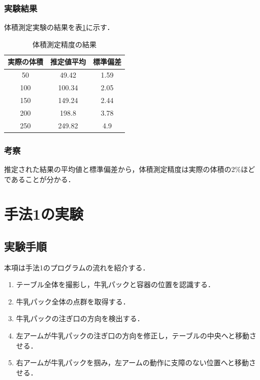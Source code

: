 		\subsubsection{実験結果}
		体積測定実験の結果を表\ref{Result0}に示す．
			\begin{table}[h]
				\centering
				\caption{体積測定精度の結果}
				\begin{tabular}{@{}ccc@{}}
					\toprule 
					実際の体積 & 推定値平均 & 標準偏差 \\ 
					\midrule
					50&  49.42 & 1.59 \\ 
					100&  100.34 & 2.05 \\ 
					150& 149.24 & 2.44 \\ 
					200& 198.8 & 3.78 \\ 
					250& 249.82 & 4.9 \\ 
					\bottomrule 
				\end{tabular} 
				
				\label{Result0}
			\end{table}
		
		\subsubsection{考察}
		推定された結果の平均値と標準偏差から，体積測定精度は実際の体積の2\%ほどであることが分かる．
		
\section{手法1の実験}
	\subsection{実験手順}\label{sec:Method1Exp-ProgramFlow}
	本項は手法1のプログラムの流れを紹介する．
	\begin{enumerate}
		\item テーブル全体を撮影し，牛乳パックと容器の位置を認識する．\\
		\item 牛乳パック全体の点群を取得する．
		\item 牛乳パックの注ぎ口の方向を検出する．
		\item 左アームが牛乳パックの注ぎ口の方向を修正し，テーブルの中央へと移動させる．
		\item 右アームが牛乳パックを掴み，左アームの動作に支障のない位置へと移動させる．
	\end{enumerate}
	
